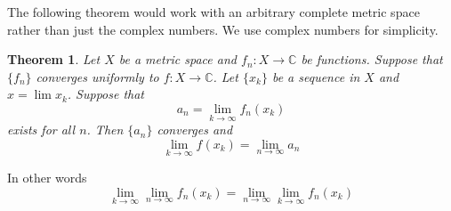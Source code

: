 \documentclass[12pt]{book}
\newcommand{\C}{{\mathbb{C}}}
\theoremstyle{plain}
\newtheorem{thm}{Theorem}[section]
\theoremstyle{remark}
\theoremstyle{definition}
\theoremstyle{exercise}
\theoremstyle{example}
\begin{document}
\medskip

The following theorem would work with an arbitrary complete metric space
rather than just the complex numbers.  We use complex numbers for
simplicity.

\medskip

\begin{thm}
Let $X$ be a metric space and
$f_n \colon X \to \C$ be functions.
Suppose that $\{ f_n \}$ converges uniformly to $f \colon X \to \C$.  
Let $\{ x_k \}$ be a sequence in $X$ and $x = \lim x_k$.  Suppose
that
\begin{equation*}
a_n = \lim_{k \to \infty} f_n(x_k)
\end{equation*}
exists for all $n$.  Then
$\{a_n\}$ converges and 
\begin{equation*}
\lim_{k \to \infty} f(x_k) = \lim_{n\to\infty} a_n
\end{equation*}
\end{thm}

In other words
\begin{equation*}
\lim_{k \to \infty} \lim_{n\to\infty} f_n(x_k) =
\lim_{n \to \infty} \lim_{k\to\infty} f_n(x_k)
\end{equation*}
\end{document}
